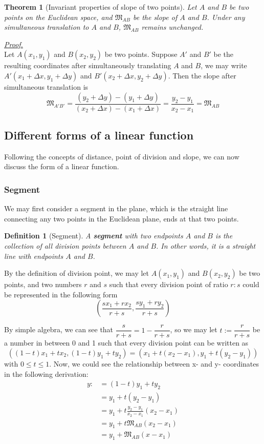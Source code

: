 \documentclass[12pt]{article}
\newtheorem{definition}{Definition}[section]
\newtheorem*{theorem}{Theorem}
\renewenvironment{proof}[1][Proof]{\begin{snugshade*} \underline{\textit{{#1}.}}\\}{\hfill \qedsymbol \end{snugshade*}}
\begin{document}
    \begin{theorem}[Invariant properties of slope of two points]
        Let $A$ and $B$ be two points on the Euclidean space, and $\mathfrak{M}_{AB}$ be the slope of $A$ and $B$. Under any simultaneous translation to $A$ and $B$, $\mathfrak{M}_{AB}$ remains unchanged.
    \end{theorem}

    \begin{proof}
        Let $A(x_1,y_1)$ and $B(x_2,y_2)$ be two points. Suppose $A'$ and $B'$ be the resulting coordinates after simultaneously translating $A$ and $B$, we may write $A'(x_1+\Delta x, y_1+\Delta y)$ and $B'(x_2+\Delta x, y_2+\Delta y)$. Then the slope after simultaneous translation is $$\mathfrak{M}_{A'B'}=\frac{(y_2+\Delta y)-(y_1+\Delta y)}{(x_2+\Delta x)-(x_1+\Delta x)}=\frac{y_2-y_1}{x_2-x_1}=\mathfrak{M}_{AB}$$
    \end{proof}

    \subsection{Different forms of a linear function}

    Following the concepts of distance, point of division and slope, we can now discuss the form of a linear function.

    \subsubsection*{Segment}

    We may first consider a segment in the plane, which is the straight line connecting any two points in the Euclidean plane, ends at that two points.

    \begin{definition}[Segment]
        A \textbf{segment} with two endpoints $A$ and $B$ is the collection of all division points between $A$ and $B$. In other words, it is a straight line with endpoints $A$ and $B$.
    \end{definition}

    By the definition of division point, we may let $A(x_1,y_1)$ and $B(x_2,y_2)$ be two points, and two numbers $r$ and $s$ such that every division point of ratio $r:s$ could be represented in the following form $$(\frac{sx_1+rx_2}{r+s},\frac{sy_1+ry_2}{r+s})$$

    By simple algebra, we can see that $\dfrac{s}{r+s}=1-\dfrac{r}{r+s}$, so we may let $t:=\dfrac{r}{r+s}$ be a number in between 0 and 1 such that every division point can be written as $$((1-t)x_1+tx_2, (1-t)y_1+ty_2)=(x_1+t(x_2-x_1),y_1+t(y_2-y_1))$$ with $0\leq t\leq 1$. Now, we could see the relationship between x- and y- coordinates in the following derivation:\begin{align*}
        y:&=(1-t)y_1+ty_2\\
        &=y_1+t(y_2-y_1)\\
        &=y_1+t\frac{y_2-y_1}{x_2-x_1}(x_2-x_1)\\
        &=y_1+t\mathfrak{M}_{AB}(x_2-x_1)\\
        &=y_1+\mathfrak{M}_{AB}(x-x_1)
    \end{align*}
\end{document}
